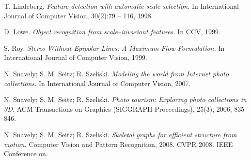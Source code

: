 \begin{thebibliography}{99}
  {\sc T. Lindeberg.} 
  \emph{Feature detection with automatic scale selection.}
  In International Journal of Computer Vision, 30(2):79 – 116, 1998.

  {\sc D. Lowe.} 
  \emph{Object recognition from scale–invariant features.}
  In CCV, 1999.


  {\sc S. Roy.} 
  \emph{Stereo Without Epipolar Lines: A Maximum-Flow Formulation.}
  In International Journal of Computer Vision, 1999.


  {\sc N. Snavely; S. M. Seitz; R. Szeliski.} 
  \emph{Modeling the world from Internet photo collections.}
  In International Journal of Computer Vision, 2007.

  {\sc N. Snavely; S. M. Seitz; R. Szeliski.} 
  \emph{Photo tourism: Exploring photo collections in 3D.}
  ACM Transactions on Graphics (SIGGRAPH Proceedings), 25(3), 2006, 835-846.

  {\sc N. Snavely; S. M. Seitz; R. Szeliski.} 
  \emph{Skeletal graphs for efficient structure from motion.}
  Computer Vision and Pattern Recognition, 2008. CVPR 2008. IEEE Conference on.



\end{thebibliography}
